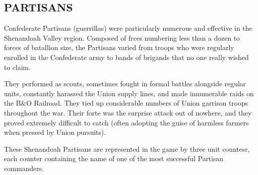 \subsection{PARTISANS}

Confederate Partisans (guerrillas) were particularly numerous and effective in the Shenandoah Valley region. Composed of frces numbering less than a dozen to forces of batallion size, the Partisans varied from troops who were regularly enrolled in the Confederate army to bands of brigands that no one really wished to claim.

They performed as scouts, sometimes fought in formal battles alongside regular units, constantly harassed the Union supply lines, and made innumerable raids on the B\&O Railroad. They tied up considerable numbers of Union garrison troops throughout the war. Their forte was the surprise attack out of nowhere, and they proved extremely difficult to catch (often adopting the guise of harmless farmers when pressed by Union pursuits).

These Shenandoah Partisans are represented in the game by three unit countesr, each counter containing the name of one of the most successful Partisan commanders.

